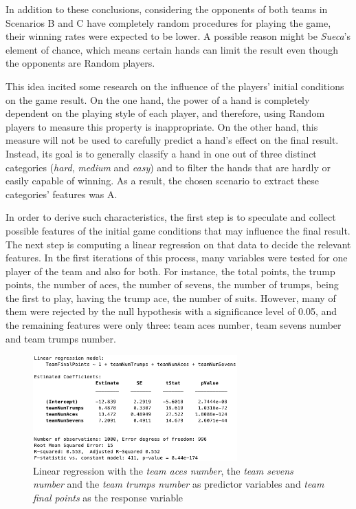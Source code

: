 In addition to these conclusions, considering the opponents of both teams in Scenarios B and C have completely random procedures for playing the game, their winning rates were expected to be lower.
A possible reason might be \emph{Sueca}'s element of chance, which means certain hands can limit the result even though the opponents are Random players.

This idea incited some research on the influence of the players' initial conditions on the game result.
On the one hand, the power of a hand is completely dependent on the playing style of each player, and therefore, using Random players to measure this property is inappropriate.
On the other hand, this measure will not be used to carefully predict a hand's effect on the final result.
Instead, its goal is to generally classify a hand in one out of three distinct categories (\emph{hard}, \emph{medium} and \emph{easy}) and to filter the hands that are hardly or easily capable of winning.
As a result, the chosen scenario to extract these categories' features was A.

In order to derive such characteristics, the first step is to speculate and collect possible features of the initial game conditions that may influence the final result.
The next step is computing a linear regression on that data to decide the relevant features.
In the first iterations of this process, many variables were tested for one player of the team and also for both.
For instance, the total points, the trump points, the number of aces, the number of sevens, the number of trumps, being the first to play, having the trump ace, the number of suits.
However, many of them were rejected by the null hypothesis with a significance level of 0.05, and the remaining features were only three: team aces number, team sevens number and team trumps number.

\begin{figure}[h!]
  \centering
    \includegraphics[width=0.7\textwidth]{./img/4/linearRegression}
  \caption{Linear regression with the \emph{team aces number}, the \emph{team sevens number} and the \emph{team trumps number} as predictor variables and \emph{team final points} as the response variable}
\label{fig:linearRegression}
\end{figure}

